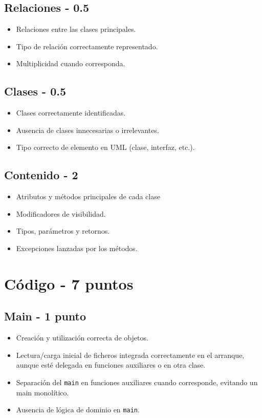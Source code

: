 \documentclass[10pt,a4paper]{article}
\begin{document}
\subsection{Relaciones - 0.5}
\begin{itemize}
    \item Relaciones entre las clases principales.
    \item Tipo de relación correctamente representado.
    \item Multiplicidad cuando corresponda.
\end{itemize}
\subsection{Clases - 0.5}
\begin{itemize}
    \item Clases correctamente identificadas.
    \item Ausencia de clases innecesarias o irrelevantes.
    \item Tipo correcto de elemento en UML (clase, interfaz, etc.).
\end{itemize}
\subsection{Contenido - 2}
\begin{itemize}
    \item Atributos y métodos principales de cada clase
    \item Modificadores de visibilidad.
    \item Tipos, parámetros y retornos.
    \item Excepciones lanzadas por los métodos.
\end{itemize}

\section{Código - 7 puntos}


\subsection{Main - 1 punto}
\begin{itemize}
    \item Creación y utilización correcta de objetos.
    \item Lectura/carga inicial de ficheros integrada correctamente en el arranque, aunque esté delegada en funciones auxiliares o en otra clase.
    \item Separación del \texttt{main} en funciones auxiliares cuando corresponde, evitando un main monolítico.
    \item Ausencia de lógica de dominio en \texttt{main}.
\end{itemize}
\end{document}
